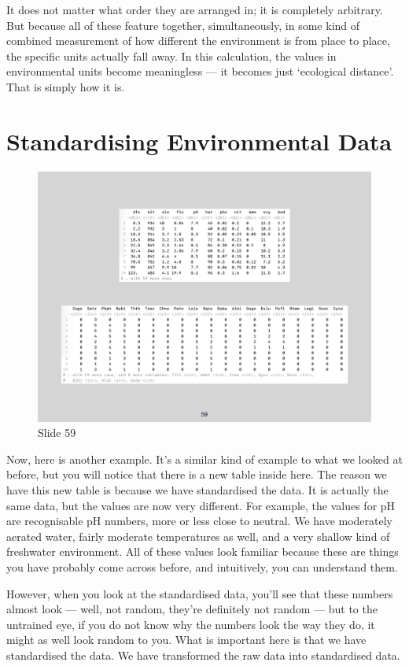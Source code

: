 \documentclass[
  10pt,
]{book}
\begin{document}
It does not matter what order they are arranged in; it is completely
arbitrary. But because all of these feature together, simultaneously, in
some kind of combined measurement of how different the environment is
from place to place, the specific units actually fall away. In this
calculation, the values in environmental units become meaningless --- it
becomes just `ecological distance'. That is simply how it is.

\section{Standardising Environmental
Data}\label{standardising-environmental-data}

\begin{figure}[ht]
\centering
\includegraphics[width=0.8\linewidth]{../images/BDC334/BDC334-059.jpeg}
\caption*{Slide 59}
\end{figure}

Now, here is another example. It's a similar kind of example to what we
looked at before, but you will notice that there is a new table inside
here. The reason we have this new table is because we have standardised
the data. It is actually the same data, but the values are now very
different. For example, the values for pH are recognisable pH numbers,
more or less close to neutral. We have moderately aerated water, fairly
moderate temperatures as well, and a very shallow kind of freshwater
environment. All of these values look familiar because these are things
you have probably come across before, and intuitively, you can
understand them.

However, when you look at the standardised data, you'll see that these
numbers almost look --- well, not random, they're definitely not random
--- but to the untrained eye, if you do not know why the numbers look
the way they do, it might as well look random to you. What is important
here is that we have standardised the data. We have transformed the raw
data into standardised data.
\end{document}
